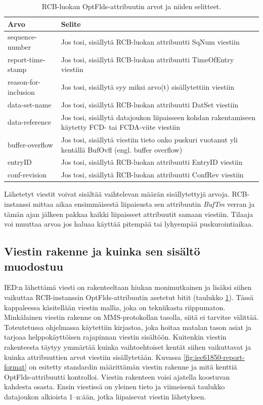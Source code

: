\begin{table}[ht!]
	\caption{RCB-luokan OptFlds-attribuutin arvot ja niiden selitteet.}
	\label{tab:iec61850-optional-fields-definition}
	\begin{tabular}{l | l}
		\hline
		\textbf{Arvo} & \textbf{Selite} \\
		\hline \hline
		sequence-number & Jos tosi, sisällytä RCB-luokan attribuutti SqNum viestiin \\
		report-time-stamp & Jos tosi, sisällytä RCB-luokan attribuutti TimeOfEntry viestiin \\
		reason-for-inclusion & Jos tosi, sisällytä syy miksi arvo(t) sisällytettiin viestiin \\
		data-set-name & Jos tosi, sisällytä RCB-luokan attribuutti DatSet viestiin \\
		data-reference & \parbox[t]{10cm}{Jos tosi, sisällytä datajoukon liipaisseen kohdan rakentamiseen käytetty FCD- tai FCDA-viite viestiin} \\
		buffer-overflow & \parbox[t]{10cm}{Jos tosi, sisällytä viestiin tieto onko puskuri vuotanut yli kentällä BufOvfl (engl. buffer overflow)} \\
		entryID & Jos tosi, sisällytä RCB-luokan attribuutti EntryID viestiin \\
		conf-revision & Jos tosi, sisällytä RCB-luokan attribuutti ConfRev viestiin \\
		\hline
	\end{tabular}
\end{table}

Lähetetyt viestit voivat sisältää vaihtelevan määrän sisällytettyjä arvoja. RCB-instanssi mittaa aikaa ensimmäisestä liipaisusta sen attribuutin \emph{BufTm} verran ja tämän ajan jälkeen pakkaa kaikki liipaisseet attribuutit samaan viestiin. Tilaaja voi muuttaa arvoa jos haluaa käyttää pitempää tai lyhyempää puskurointiaikaa.


\subsection{Viestin rakenne ja kuinka sen sisältö muodostuu}
\label{ch:viestin-rakenne}
IED:n lähettämä viesti on rakenteeltaan hiukan monimutkainen ja lisäksi siihen vaikuttaa RCB-instanssin OptFlds-attribuutin asetetut bitit (taulukko \ref{tab:iec61850-optional-fields-definition}). Tässä kappaleessa käsitellään viestin mallia, joka on tekniikasta riippumaton. Minkälainen viestin rakenne on MMS-protokollan tasolla, siitä ei tarvitse välittää. Toteutetussa ohjelmassa käytettiin kirjastoa, joka hoitaa matalan tason asiat ja tarjoaa helppokäyttöisen rajapinnan viestin sisältöön. Kuitenkin viestin rakenteesta täytyy ymmärtää kuinka vaihtoehtoiset kentät siihen vaikuttavat ja kuinka attribuuttien arvot viestiin sisällytetään. Kuvassa \ref{fig:iec61850-report-format} on esitetty standardin määrittämän viestin rakenne ja mitä kenttiä OptFlds-attribuutti kontrolloi. Viestin rakenteen voisi ajatella koostuvan kahdesta osasta. Ensin viestissä on yleinen tieto ja viimeisenä taulukko datajoukon alkioista 1--n:ään, jotka liipaisevat viestin lähetyksen.

